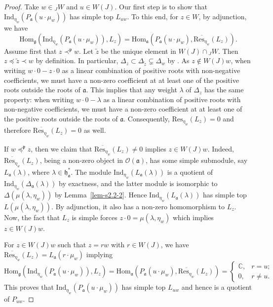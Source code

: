 \documentclass[a4paper]{amsart}
\begin{document}
\begin{proof}
Take $w\in{}_JW$ and $u\in W(J)$.
Our first step is to show that 
$\mathrm{Ind}_{\eta_w}(P_\mathfrak{a}(u\cdot \mu_w))$
has simple top $L_{uw}$. To this end, for $z\in W$, by adjunction,
we have
\begin{displaymath}
\mathrm{Hom}_\mathfrak{g}
(\mathrm{Ind}_{\eta_w}(P_\mathfrak{a}(u\cdot \mu_w)),L_z)=
\mathrm{Hom}_\mathfrak{a}
(P_\mathfrak{a}(u\cdot \mu_w),
\overline{\mathrm{Res}_{\eta_w}}(L_z)).
\end{displaymath}
Assume first that $z\prec^\mathfrak{p}w$.
Let $\tilde{z}$ be the unique element in $W(J)\cap {}_JW$.
Then $z\preceq\tilde{z}\prec w$ by definition. In particular,
$\Delta_z\subset \Delta_{\tilde{z}} \subsetneq \Delta_w$ by 
\cite[Theorem~7.7.7]{Di}. As $z\not \in W(J)w$,
when writing $w\cdot 0-z\cdot 0$ as a linear combination of
positive roots with non-negative coefficients, we must have
a non-zero coefficient at at least one of the positive roots
outside the roots of $\mathfrak{a}$. This implies that any 
weight $\lambda$ of $\Delta_z$ has the same property: 
when writing $w\cdot 0-\lambda$ as a linear combination of
positive roots with non-negative coefficients, we must have
a non-zero coefficient at at least one of the positive roots
outside the roots of $\mathfrak{a}$.
Consequently, ${\mathrm{Res}_{\eta_w}}(L_z)=0$
and therefore $\overline{\mathrm{Res}_{\eta_w}}(L_z)=0$ as well.


If $w{\preceq^\mathfrak{p}}z$, then we claim that
$\overline{\mathrm{Res}_{\eta_w}}(L_z)\neq 0$ implies $z\in W(J)w$.
Indeed, $\overline{\mathrm{Res}_{\eta_w}}(L_z)$, being a
non-zero object in $\mathcal{O}(\mathfrak{a})$, has some simple
submodule, say $L_\mathfrak{a}(\lambda)$, where 
$\lambda\in \mathfrak{h}^*_\mathfrak{a}$. The module
$\mathrm{Ind}_{\eta_w}(L_\mathfrak{a}(\lambda))$ is a quotient of
$\mathrm{Ind}_{\eta_w}(\Delta_\mathfrak{a}(\lambda))$ by exactness, 
and the latter module is 
isomorphic to $\Delta(\mu(\lambda,\eta_w))$ by Lemma~\ref{lem-s2.2-2}.
Hence $\mathrm{Ind}_{\eta_w}(L_\mathfrak{a}(\lambda))$ has simple top
$L(\mu(\lambda,\eta_w))$. By adjunction, it also has a non-zero homomorphism
to $L_z$. Now, the fact that $L_z$ is simple  forces 
$z\cdot 0=\mu(\lambda,\eta_w)$ which implies $z\in W(J)w$.

For $z\in W(J)w$ such that $z=rw$ with $r\in W(J)$, we have 
$\overline{\mathrm{Res}_{\eta_w}}(L_z)=L_\mathfrak{a}(r\cdot \mu_w)$
implying 
\begin{displaymath}
\mathrm{Hom}_\mathfrak{g}
(\mathrm{Ind}_{\eta_w}(P_\mathfrak{a}(u\cdot \mu_w)),L_z)=
\mathrm{Hom}_\mathfrak{a}
(P_\mathfrak{a}(u\cdot \mu_w),
\overline{\mathrm{Res}_{\eta_w}}(L_z))=
\begin{cases}
\mathbb{C},& r=u;\\
0,& r\neq u.
\end{cases}
\end{displaymath}
This proves that $\mathrm{Ind}_{\eta_w}(P_\mathfrak{a}(u\cdot \mu_w))$
has simple top $L_{uw}$ and hence is a quotient of $P_{uw}$.


\end{proof}
\end{document}
